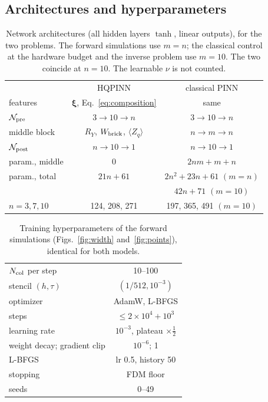 \documentclass[floatfix,aps,pra,twocolumn,superscriptaddress,10pt,nofootinbib]{revtex4-2}
\newcommand{\Ncol}{N_{\rm col}}
\begin{document}
\begin{appendices}
\subsection{Architectures and hyperparameters}\label{app:hyper}

\begin{table}[h]
\caption{\justifying Network architectures (all hidden layers $\tanh$, linear outputs), for the two problems. The forward simulations use $m=n$; the classical control at the hardware budget and the inverse problem use $m=10$. The two coincide at $n=10$. The learnable $\nu$ is not counted.}
\label{tab:arch}
\setlength{\tabcolsep}{2pt}
\footnotesize
\begin{ruledtabular}
\begin{tabular}{lcc}
 & HQPINN & classical PINN\\
\colrule
features & $\bm\xi$, Eq.~\eqref{eq:composition} & same\\
$\mathcal N_{\rm pre}$ & $3\to10\to n$ & $3\to10\to n$\\
middle block & $R_Y$, $W_{\rm brick}$, $\langle Z_q\rangle$ & $n\to m\to n$\\
$\mathcal N_{\rm post}$ & $n\to10\to1$ & $n\to10\to1$\\
param., middle & 0 & $2nm+m+n$\\
param., total & $21n+61$ & $2n^2+23n+61$ $(m{=}n)$\\
 & & $42n+71$ $(m{=}10)$\\
$n=3,7,10$ & 124, 208, 271 & 197, 365, 491 $(m{=}10)$\\
\end{tabular}
\end{ruledtabular}
\end{table}

\begin{table}[h]
\caption{\justifying Training hyperparameters of the forward simulations (Figs.~\ref{fig:width} and~\ref{fig:points}), identical for both models.}
\label{tab:hyper_sim}
\setlength{\tabcolsep}{2pt}
\footnotesize
\begin{ruledtabular}
\begin{tabular}{lc}
$\Ncol$ per step & 10--100\\
stencil $(h,\tau)$ & $(1/512,10^{-3})$\\
optimizer & AdamW, L-BFGS\\
steps & $\le2{\times}10^4+10^3$\\
learning rate & $10^{-3}$, plateau $\times\frac12$\\
weight decay; gradient clip & $10^{-6}$; 1\\
L-BFGS & lr 0.5, history 50\\
stopping & FDM floor\\
seeds & 0--49\\
\end{tabular}
\end{ruledtabular}
\end{table}


\end{appendices}
\end{document}
